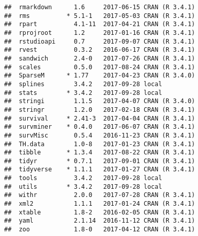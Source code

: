 \documentclass[]{book}
\theoremstyle{definition}
\theoremstyle{definition}
\theoremstyle{definition}
\theoremstyle{remark}
\begin{document}
\begin{verbatim}
##  rmarkdown      1.6     2017-06-15 CRAN (R 3.4.1)
##  rms          * 5.1-1   2017-05-03 CRAN (R 3.4.1)
##  rpart          4.1-11  2017-04-21 CRAN (R 3.4.1)
##  rprojroot      1.2     2017-01-16 CRAN (R 3.4.1)
##  rstudioapi     0.7     2017-09-07 CRAN (R 3.4.1)
##  rvest          0.3.2   2016-06-17 CRAN (R 3.4.1)
##  sandwich       2.4-0   2017-07-26 CRAN (R 3.4.1)
##  scales         0.5.0   2017-08-24 CRAN (R 3.4.1)
##  SparseM      * 1.77    2017-04-23 CRAN (R 3.4.0)
##  splines        3.4.2   2017-09-28 local         
##  stats        * 3.4.2   2017-09-28 local         
##  stringi        1.1.5   2017-04-07 CRAN (R 3.4.0)
##  stringr        1.2.0   2017-02-18 CRAN (R 3.4.1)
##  survival     * 2.41-3  2017-04-04 CRAN (R 3.4.1)
##  survminer    * 0.4.0   2017-06-07 CRAN (R 3.4.1)
##  survMisc       0.5.4   2016-11-23 CRAN (R 3.4.1)
##  TH.data        1.0-8   2017-01-23 CRAN (R 3.4.1)
##  tibble       * 1.3.4   2017-08-22 CRAN (R 3.4.1)
##  tidyr        * 0.7.1   2017-09-01 CRAN (R 3.4.1)
##  tidyverse    * 1.1.1   2017-01-27 CRAN (R 3.4.1)
##  tools          3.4.2   2017-09-28 local         
##  utils        * 3.4.2   2017-09-28 local         
##  withr          2.0.0   2017-07-28 CRAN (R 3.4.1)
##  xml2           1.1.1   2017-01-24 CRAN (R 3.4.1)
##  xtable         1.8-2   2016-02-05 CRAN (R 3.4.1)
##  yaml           2.1.14  2016-11-12 CRAN (R 3.4.1)
##  zoo            1.8-0   2017-04-12 CRAN (R 3.4.1)
\end{verbatim}


\end{document}
